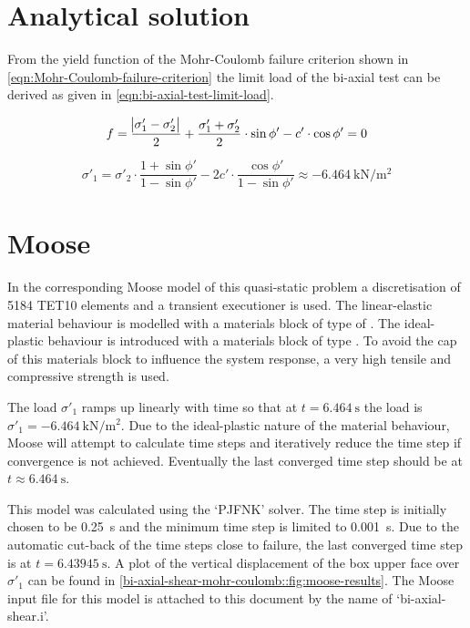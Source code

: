\section{Analytical solution}
\label{bi-axial-shear-mohr-coulomb:sec:analytical-solution}

From the yield function of the Mohr-Coulomb failure criterion shown in
\autoref{eqn:Mohr-Coulomb-failure-criterion} the limit load of the bi-axial
test can be derived as given in \autoref{eqn:bi-axial-test-limit-load}.

\begin{equation}
    \label{eqn:Mohr-Coulomb-failure-criterion}
    f = \frac{\abs{\sigma'_1 - \sigma'_2}}{2} + \frac{\sigma'_1 + \sigma'_2}{2} \cdot \sin{\phi'} - c' \cdot \cos{\phi'} = 0
\end{equation}

\begin{equation}
    \label{eqn:bi-axial-test-limit-load}
    \sigma'_1 = \sigma'_2 \cdot \frac{1 + \sin{\phi'}}{1 - \sin{\phi'}} - 2c' \cdot \frac{\cos{\phi'}}{1 - \sin{\phi'}}
    \approx \qty{-6.464}{\kilo\newton\per\square\metre}
\end{equation}

\section{Moose}
\label{bi-axial-shear-mohr-coulomb:sec:moose}

In the corresponding Moose model of this quasi-static problem a discretisation
of \qty{5184}{} TET10 elements and a transient executioner is used. The
linear-elastic material behaviour is modelled with a materials block of type of
. The ideal-plastic behaviour is
introduced with a materials block of type
. To avoid the cap of this materials
block to influence the system response, a very high tensile and compressive
strength is used.

The load $\sigma'_1$ ramps up linearly with time so that at $t =
    \qty{6.464}{\second}$ the load is $\sigma'_1 =
    \qty{-6.464}{\kilo\newton\per\square\metre}$. Due to the ideal-plastic nature
of the material behaviour, Moose will attempt to calculate time steps and
iteratively reduce the time step if convergence is not achieved. Eventually the
last converged time step should be at $t \approx \qty{6.464}{\second}$.

This model was calculated using the ‘PJFNK’ solver. The time step is initially
chosen to be \qty{0.25}{\second} and the minimum time step is limited to
\qty{0.001}{\second}. Due to the automatic cut-back of the time steps close to
failure, the last converged time step is at $t=\qty{6.43945}{\second}$. A plot
of the vertical displacement of the box upper face over $\sigma'_1$ can be
found in \autoref{bi-axial-shear-mohr-coulomb::fig:moose-results}. The Moose
input file for this model is attached to this document by the name of
‘bi-axial-shear.i’.

